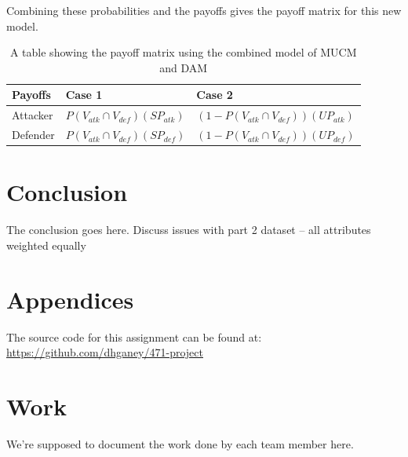 \documentclass[11pt,journal]{IEEEtran}
\begin{document}
Combining these probabilities and the payoffs gives the payoff matrix for this new model.
 \begin{table}[H]
{\renewcommand{\arraystretch}{1.2}%
\begin{tabular}{ |l | l | l | }
\hline
Payoffs & Case 1  & Case 2 \\ \hline
Attacker & $P(V_{atk}\cap V_{def})(SP_{atk})$ & $(1-P(V_{atk}\cap V_{def}))(UP_{atk})$    \\ \hline
 Defender  & $P(V_{atk}\cap V_{def})(SP_{def})$ & $(1-P(V_{atk}\cap V_{def}))(UP_{def})$  \\ \hline

\end{tabular}} \quad
\caption{A table showing the payoff matrix using the combined model of MUCM and DAM} 
\end{table}


\section{Conclusion} \label{conclusion}
The conclusion goes here.
Discuss issues with part 2 dataset -- all attributes weighted equally


\section*{Appendices}

The source code for this assignment can be found at:
\url{https://github.com/dhganey/471-project}


\section*{Work}
We're supposed to document the work done by each team member here.




\end{document}
